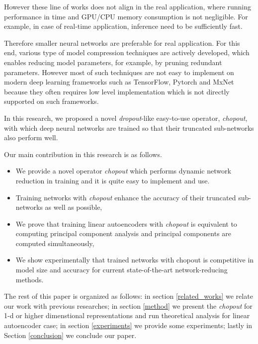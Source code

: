 \documentclass{article}
\begin{document}
    However these line of works does not align in the real application, where running performance in time and GPU/CPU memory consumption is not negligible. For example, in case of real-time application, inference need to be sufficiently fast. 

    Therefore smaller neural networks are preferable for real application. For this end, various type of model compression techniques are actively developed, which enables reducing model parameters, for example, by pruning redundant parameters. However most of such techniques are not easy to implement on modern deep learning frameworks such as TensorFlow, Pytorch and MxNet because they often requires low level implementation which is not directly supported on such frameworks.

    In this research, we proposed a novel \textit{dropout}-like easy-to-use operator, \textit{chopout}, with which deep neural networks are trained so that their truncated sub-networks also perform well. 

        
    Our main contribution in this research is as follows.
    \begin{itemize} 
      \item We provide a novel operator \textit{chopout} which performs dynamic network reduction in training and it is quite easy to implement and use.      
      \item Training networks with \textit{chopout} enhance the accuracy of their truncated sub-networks as well as possible,
      \item We prove that training linear autoencoders with \textit{chopout} is equivalent to computing principal component analysis and
      principal components are computed simultaneously, 
      \item We show experimentally that trained networks with chopout is competitive in model size and accuracy for current state-of-the-art network-reducing methods.
    \end{itemize}

    The rest of this paper is organized as follows: 
    in section \ref{related_works} we relate our work with previous researches;
    in section \ref{method} we present the \textit{chopout} for 1-d or higher dimenstional representations and run theoretical analysis for linear autoencoder case;
    in section \ref{experiments} we provide some experiments; 
    lastly in Section \ref{conclusion} we conclude our paper. 

\end{document}
